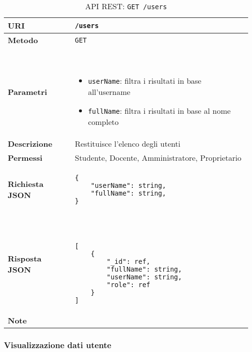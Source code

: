         \begin{table}[H]
            \begin{center}
                \begin{tabular}{p{} p{}}
                    \toprule
                    \textbf{URI} & \texttt{/users} \\ \midrule
                    \textbf{Metodo} & \texttt{GET} \\ \midrule
                    \textbf{Parametri} & \
                        \begin{itemize}
                            \item \texttt{userName}: filtra i risultati in base all'username
                            \item \texttt{fullName}: filtra i risultati in base al nome completo
                        \end{itemize} 
                        \\ \midrule
                    \textbf{Descrizione} & Restituisce l'elenco degli utenti \\ \midrule
                    \textbf{Permessi} & Studente, Docente, Amministratore, Proprietario  \\ \midrule
                    \textbf{Richiesta JSON} &
                        \begin{lstlisting}[basicstyle={\ttfamily}]
{
	"userName": string,
	"fullName": string,
}
                        \end{lstlisting}
                     \\ \midrule
                    \textbf{Risposta JSON} & \
                        \begin{lstlisting}[basicstyle={\ttfamily}]
[
    {
        "_id": ref,
        "fullName": string,
        "userName": string,
        "role": ref
    }
]
                        \end{lstlisting}
                        \\ \midrule
                    \textbf{Note} & \\
                    \bottomrule
                \end{tabular}
                \caption{API REST: \texttt{GET /users}}
            \end{center}
        \end{table}

    \subsubsection{Visualizzazione dati utente}

